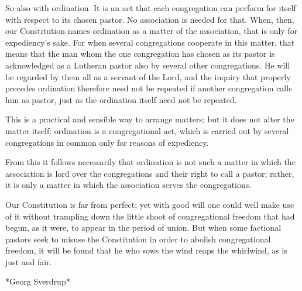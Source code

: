 So also with ordination. It is an act that each congregation can perform for itself with respect to its chosen pastor. No association is needed for that. When, then, our Constitution names ordination as a matter of the association, that is only for expediency's sake. For when several congregations cooperate in this matter, that means that the man whom the one congregation has chosen as its pastor is acknowledged as a Lutheran pastor also by several other congregations. He will be regarded by them all as a servant of the Lord, and the inquiry that properly precedes ordination therefore need not be repeated if another congregation calls him as pastor, just as the ordination itself need not be repeated.

This is a practical and sensible way to arrange matters; but it does not alter the matter itself: ordination is a congregational act, which is carried out by several congregations in common only for reasons of expediency.

From this it follows necessarily that ordination is not such a matter in which the association is lord over the congregations and their right to call a pastor; rather, it is only a matter in which the association serves the congregations.

Our Constitution is far from perfect; yet with good will one could well make use of it without trampling down the little shoot of congregational freedom that had begun, as it were, to appear in the period of union. But when some factional pastors seek to misuse the Constitution in order to abolish congregational freedom, it will be found that he who sows the wind reaps the whirlwind, as is just and fair.

*Georg Sverdrup*
